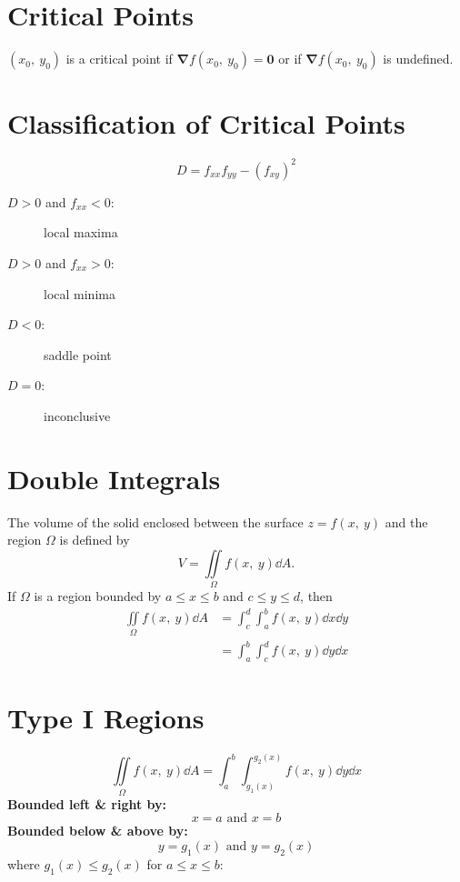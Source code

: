 \documentclass{article}
\begin{document}
\begin{multicols}{3}
    \section*{Critical Points}
    \((x_0,\: y_0)\) is a critical point if \(\symbf{\nabla}f(x_0,\: y_0) = \symbf{0}\)
    or if \(\symbf{\nabla}f(x_0,\: y_0)\) is undefined.
    \section*{Classification of Critical Points}
    \begin{equation*}
        D = f_{xx}f_{yy} - \left( f_{xy} \right)^2
    \end{equation*}
    \begin{description}
        \item[\(D > 0\) and \(f_{xx} < 0\):] local maxima
        \item[\(D > 0\) and \(f_{xx} > 0\):] local minima
        \item[\(D < 0\):] saddle point
        \item[\(D = 0\):] inconclusive
    \end{description}
    \section*{Double Integrals}
    The volume of the solid
    enclosed between the surface \(z=f(x,\: y)\) and the region \(\Omega\) is
    defined by
    \begin{equation*}
        V = \iint\limits_{\Omega} f(x,\: y) \dd{A}.
    \end{equation*}
    If \(\Omega\) is a region bounded by \(a \leq x \leq b\) and \(c \leq y \leq d\), then
    \begin{align*}
        \iint\limits_{\Omega} f(x,\: y) \dd{A} & = \int_c^d\int_a^b f(x,\: y) \dd{x} \dd{y} \\
                                               & = \int_a^b\int_c^d f(x,\: y) \dd{y} \dd{x}
    \end{align*}
    \section*{Type I Regions}
    \begin{equation*}
        \iint\limits_{\Omega} f(x,\: y) \dd{A} = \int_a^b\int_{g_1(x)}^{g_2(x)} f(x,\: y) \dd{y} \dd{x}
    \end{equation*}
    \textbf{Bounded left \& right by:}
    \begin{equation*}
        x=a \text{ and } x=b
    \end{equation*}
    \textbf{Bounded below \& above by:}
    \begin{equation*}
        y=g_1(x) \text{ and } y=g_2(x)
    \end{equation*}
    where \(g_1(x) \leq g_2(x)\) for \(a \leq x \leq b\):

\end{multicols}
\end{document}
